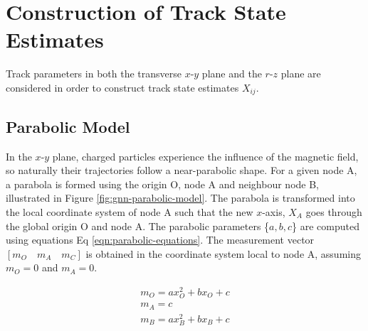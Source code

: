 




\section{Construction of Track State Estimates}
\label{constructing-track-states}

Track parameters in both the transverse $x$-$y$ plane and the $r$-$z$ plane are considered in order to construct track state estimates $X_{ij}$.


\subsection{Parabolic Model}
\label{parabolic-state}

In the $x$-$y$ plane, charged particles experience the influence of the magnetic field, so naturally their trajectories follow a near-parabolic shape. For a given node A, a parabola is formed using the origin O, node A and neighbour node B, illustrated in Figure \ref{fig:gnn-parabolic-model}. The parabola is transformed into the local coordinate system of node A such that the new $x$-axis, $X_A$ goes through the global origin O and node A. The parabolic parameters \{$a, b, c$\} are computed using equations Eq \eqref{eqn:parabolic-equations}. The measurement vector $[m_O \quad m_A \quad m_C]$ is obtained in the coordinate system local to node A, assuming $m_O = 0$ and $m_A = 0$.

\begin{equation}
\begin{aligned}
m_O = ax_{O}^{2} + bx_O + c \\
m_A = c \\
m_B = ax_{B}^{2} + bx_B + c
\end{aligned}
\label{eqn:parabolic-equations}
\end{equation}


